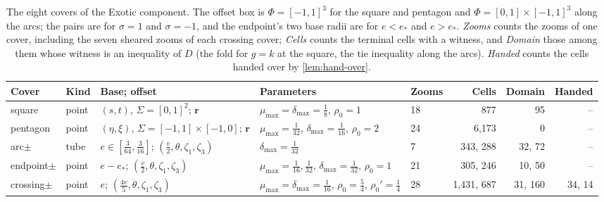 \begin{table}[ht]
\centering\footnotesize
\setlength{\tabcolsep}{2.2pt}
\begin{tabular}{lllllrrr}
  \toprule
  Cover & Kind & Base; offset & Parameters & Zooms & Cells & Domain & Handed\\
  \midrule
  square & point & $(s,t)$, $\Sigma={[0,1]}^2$; $\mathbf r$ & $\mu_{\max}=\delta_{\max}=\frac18$, $\rho_0=1$ & 18 & 877 & 95 & --\\
  pentagon & point & $(\eta,\xi)$, $\Sigma=[-1,1]{\times}[-1,0]$; $\mathbf r$ & $\mu_{\max}=\frac1{32}$, $\delta_{\max}=\frac1{16}$, $\rho_0=2$ & 24 & 6{,}173 & 0 & --\\
  arc$\pm$ & tube & $e\in[\frac3{64},\frac3{16}]$; $(\frac v2,\theta,\zeta_1,\zeta_3)$ & $\delta_{\max}=\frac1{32}$ & 7 & 343, 288 & 32, 72 & --\\
  endpoint$\pm$ & point & $e-e_*$; $(\frac v2,\theta,\zeta_1,\zeta_3)$ & $\mu_{\max}=\frac1{16},\frac1{32}$, $\delta_{\max}=\frac1{32}$, $\rho_0=1$ & 21 & 305, 246 & 10, 50 & --\\
  crossing$\pm$ & point & $e$; $(\frac{4v}5,\theta,\zeta_1,\zeta_3)$ & $\mu_{\max}=\delta_{\max}=\frac1{16}$, $\rho_0=\frac54$, $\rho_0'=\frac14$ & 28 & 1{,}431, 687 & 31, 160 & 34, 14\\
  \bottomrule
\end{tabular}
\caption{The eight covers of the Exotic component. The offset box is
$\Phi={[-1,1]}^3$ for the square and pentagon and $\Phi=[0,1]\times{[-1,1]}^3$
along the arcs; the pairs are for $\sigma=1$ and $\sigma=-1$, and the
endpoint's two base radii are for $e<e_*$ and $e>e_*$. \emph{Zooms} counts
the zooms of one cover, including the seven sheared zooms of each crossing
cover; \emph{Cells} counts the terminal cells with a witness, and
\emph{Domain} those among them whose witness is an inequality of $D$ (the
fold for $g=k$ at the square, the tie inequality along the arcs).
\emph{Handed} counts the cells handed over by \cref{lem:hand-over}.}
\label{tab:exotic-covers}
\end{table}
